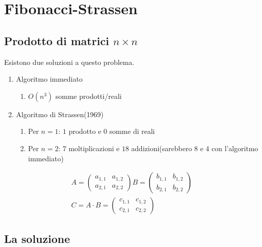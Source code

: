 \section{Fibonacci-Strassen}

\subsection{Prodotto di matrici $n \times n$}

Esistono due soluzioni a questo problema.
\begin{enumerate}
    \item Algoritmo immediato \begin{enumerate}
        \item $O(n^3)$ somme prodotti/reali
    \end{enumerate}
    \item Algoritmo di Strassen(1969) \begin{enumerate}
        \item Per $n = 1$: $1$ prodotto e $0$ somme di reali
        \item Per $n = 2$: $7$ moltiplicazioni e $18$ addizioni(sarebbero $8$ e $4$ con l'algoritmo immediato)
    \end{enumerate}
\end{enumerate}

\begin{gather}
A = \begin{pmatrix}
    a_{1,1} & a_{1,2} \\
    a_{2,1} & a_{2,2}
\end{pmatrix} B = \begin{pmatrix}
    b_{1,1} & b_{1,2} \\
    b_{2,1} & b_{2,2}
\end{pmatrix} \\
C = A \cdot B = \begin{pmatrix}
    c_{1,1} & c_{1,2} \\
    c_{2,1} & c_{2,2}
\end{pmatrix}
\end{gather}

\subsection{La soluzione}


